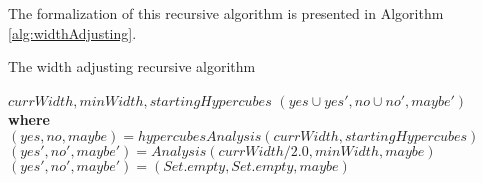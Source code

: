 The formalization of this recursive algorithm is presented in Algorithm \ref{alg:widthAdjusting}.

\begin{algorithm}
\caption{The width adjusting recursive algorithm} \label{alg:widthAdjusting}
\begin{algorithmic} 
 {$currWidth, minWidth, startingHypercubes$}
  \State \Return $(yes \cup yes', no \cup no', maybe')$
  \State \textbf{where}
    \State $(yes, no, maybe) = hypercubesAnalysis(currWidth, startingHypercubes )$
      \State $(yes', no', maybe') = Analysis(currWidth/2.0, minWidth, maybe)$
    \Else
      \State $(yes', no', maybe') = (Set.empty, Set.empty, maybe)$
    \EndIf
\EndFunction
\end{algorithmic}
\end{algorithm}



